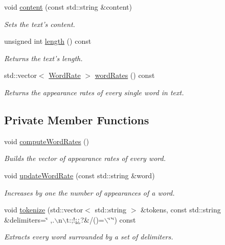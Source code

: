 \begin{CompactItemize}
void \hyperlink{class_text_eca454f28010b6b3e7bd0d771b8eaeb2}{content} (const std::string \&content)
\begin{CompactList}\small\item\em Sets the text's content. \item\end{CompactList}\item 
unsigned int \hyperlink{class_text_8d76db538f8617fb8880ba3e4ff3e6a5}{length} () const 
\begin{CompactList}\small\item\em Returns the text's length. \item\end{CompactList}\item 
std::vector$<$ \hyperlink{_word_rate_8h_8cfef8793106ac45a83059bd5573cbb3}{WordRate} $>$ \hyperlink{class_text_1387d9767b65f80355f1bdede26a0f7b}{wordRates} () const 
\begin{CompactList}\small\item\em Returns the appearance rates of every single word in text. \item\end{CompactList}\end{CompactItemize}
\subsection*{Private Member Functions}
\begin{CompactItemize}
\item 
void \hyperlink{class_text_8239e13039bcc1c713f66f1236693706}{computeWordRates} ()
\begin{CompactList}\small\item\em Builds the vector of appearance rates of every word. \item\end{CompactList}\item 
void \hyperlink{class_text_5ab8f9bfa566de537a167991fe10eff5}{updateWordRate} (const std::string \&word)
\begin{CompactList}\small\item\em Increases by one the number of appearances of a word. \item\end{CompactList}\item 
void \hyperlink{class_text_6b26c004c1cac61015f7d49c364a007d}{tokenize} (std::vector$<$ std::string $>$ \&tokens, const std::string \&delimiters=\char`\"{} ,.$\backslash$n$\backslash$t:;!¡¿?\&/()=$\backslash$\char`\"{}'\char`\"{}) const 
\begin{CompactList}\small\item\em Extracts every word surrounded by a set of delimiters. \item\end{CompactList}\end{CompactItemize}
